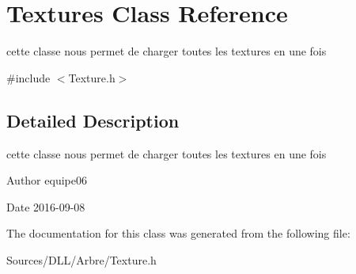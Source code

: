\hypertarget{class_textures}{}\section{Textures Class Reference}
\label{class_textures}


cette classe nous permet de charger toutes les textures en une fois  




{\ttfamily \#include $<$Texture.\+h$>$}



\subsection{Detailed Description}
cette classe nous permet de charger toutes les textures en une fois 

\begin{DoxyAuthor}{Author}
equipe06 
\end{DoxyAuthor}
\begin{DoxyDate}{Date}
2016-\/09-\/08 
\end{DoxyDate}


The documentation for this class was generated from the following file\+:\begin{DoxyCompactItemize}
\item 
Sources/\+D\+L\+L/\+Arbre/Texture.\+h\end{DoxyCompactItemize}
